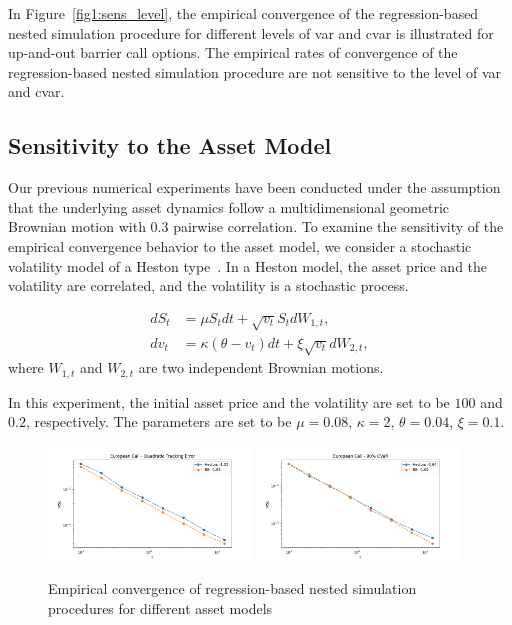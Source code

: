 In Figure~\ref{fig1:sens_level}, the empirical convergence of the regression-based nested simulation procedure for different levels of \gls{var} and \gls{cvar} is illustrated for up-and-out barrier call options.
The empirical rates of convergence of the regression-based nested simulation procedure are not sensitive to the level of \gls{var} and \gls{cvar}.

\subsection{Sensitivity to the Asset Model}\label{sec1:sensitivity-assetModel}

Our previous numerical experiments have been conducted under the assumption that the underlying asset dynamics follow a multidimensional geometric Brownian motion with $0.3$ pairwise correlation.
To examine the sensitivity of the empirical convergence behavior to the asset model, we consider a stochastic volatility model of a Heston type~\citep{heston1993closed}.
In a Heston model, the asset price and the volatility are correlated, and the volatility is a stochastic process.

\begin{align*}
    dS_t &= \mu S_t dt + \sqrt{v_t} S_t dW_{1,t}, \\
    dv_t &= \kappa (\theta - v_t) dt + \xi \sqrt{v_t} dW_{2,t},
\end{align*}
where $W_{1,t}$ and $W_{2,t}$ are two independent Brownian motions.

In this experiment, the initial asset price and the volatility are set to be $100$ and $0.2$, respectively. The parameters are set to be $\mu = 0.08$, $\kappa = 2$, $\theta = 0.04$, $\xi = 0.1$.

\begin{figure}[ht!] 
    \centering
    \includegraphics[width=0.48\textwidth]{./project1/figures/figure10a.png}
    \includegraphics[width=0.48\textwidth]{./project1/figures/figure10b.png}
    \caption{Empirical convergence of regression-based nested simulation procedures for different asset models}
\label{fig1:sens_model}
\end{figure}

